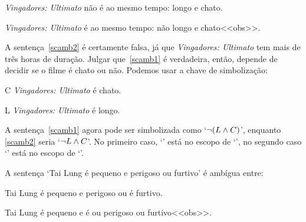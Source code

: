 \begin{earg}
	\item[\ex{scamb1}] \emph{Vingadores: Ultimato} não é ao mesmo tempo: longo e chato.
	\item[\ex{scamb2}] \emph{Vingadores: Ultimato} é ao mesmo tempo: não longo e chato<<obs>>.
\end{earg}

A sentença~\ref{scamb2} é certamente falsa, já que \emph{Vingadores: Ultimato} tem mais de três horas de duração. Julgar que~\ref{scamb1} é verdadeira, então, depende de decidir se o filme é chato ou não. Podemos usar a chave de simbolização: 

\begin{ekey}
	\item[C] \emph{Vingadores: Ultimato} é chato.
	\item[L] \emph{Vingadores: Ultimato} é longo.
\end{ekey}

A sentença~\ref{scamb1} agora pode ser simbolizada como `$\neg(L \wedge C)$', enquanto \ref{scamb2} seria `$\neg L \wedge C$'. No primeiro caso, `\eand' está no escopo de `\enot', no segundo caso `\enot' está no escopo de `\eand'. 

A sentença `Tai Lung é pequeno e perigoso ou furtivo' é ambígua entre: 

\begin{earg}
	\item[\ex{scamb3}] Tai Lung é pequeno e perigoso ou é furtivo.
	\item[\ex{scamb4}] Tai Lung é pequeno e é ou perigoso ou furtivo<<obs>>.
\end{earg} 

